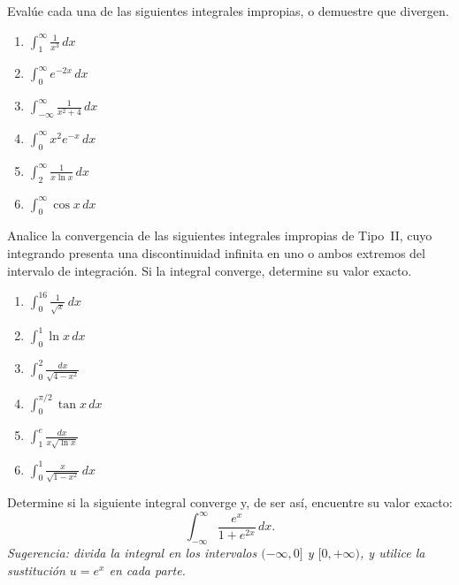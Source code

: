 \begin{prob}
Evalúe cada una de las siguientes integrales impropias, o demuestre que
divergen.
\begin{enumerate}
    \item $\displaystyle \int_{1}^{\infty} \frac{1}{x^3} \, dx$
    \item $\displaystyle \int_{0}^{\infty} e^{-2x} \, dx$
    \item $\displaystyle \int_{-\infty}^{\infty} \frac{1}{x^2 + 4} \, dx$
    \item $\displaystyle \int_{0}^{\infty} x^2 e^{-x} \, dx$
    \item $\displaystyle \int_{2}^{\infty} \frac{1}{x \ln x} \, dx$
    \item $\displaystyle \int_{0}^{\infty} \cos x \, dx$
\end{enumerate}
\end{prob}

\begin{prob}
Analice la convergencia de las siguientes integrales impropias de Tipo~II,
cuyo integrando presenta una discontinuidad infinita en uno o ambos
extremos del intervalo de integración. Si la integral converge, determine
su valor exacto.
\begin{enumerate}
    \item $\displaystyle \int_{0}^{16} \frac{1}{\sqrt{x}} \, dx$
    \item $\displaystyle \int_{0}^{1} \ln x \, dx$
    \item $\displaystyle \int_{0}^{2} \frac{dx}{\sqrt{4 - x^2}}$
    \item $\displaystyle \int_{0}^{\pi/2} \tan x \, dx$
    \item $\displaystyle \int_{1}^{e} \frac{dx}{x\sqrt{\ln x}}$
    \item $\displaystyle \int_{0}^{1} \frac{x}{\sqrt{1 - x^2}} \, dx$
\end{enumerate}
\end{prob}


\begin{prob}
Determine si la siguiente integral converge y, de ser así, encuentre su
valor exacto:
\[
    \int_{-\infty}^{\infty} \frac{e^x}{1 + e^{2x}} \, dx.
\]
\textit{Sugerencia: divida la integral en los intervalos $(-\infty, 0]$ y
$[0, +\infty)$, y utilice la sustitución $u = e^x$ en cada parte.}
\end{prob}


